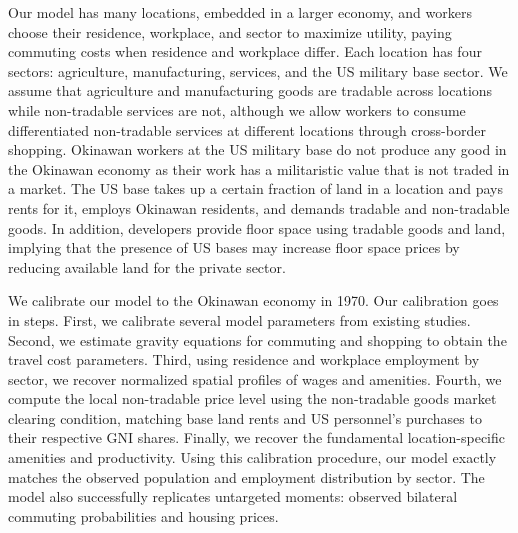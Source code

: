 \documentclass[12pt, unicode, a4paper]{article}
\newcommand{\1}{\mbox{1}\hspace{-0.25em}\mbox{l}} %
\begin{document}
Our model has many locations, embedded in a larger economy, and workers choose their residence, workplace, and sector to maximize utility, paying commuting costs when residence and workplace differ. Each location has four sectors: agriculture, manufacturing, services, and the US military base sector. We assume that agriculture and manufacturing goods are tradable across locations while non-tradable services are not, although we allow workers to consume differentiated non-tradable services at different locations through cross-border shopping. Okinawan workers at the US military base do not produce any good in the Okinawan economy as their work has a militaristic value that is not traded in a market. The US base takes up a certain fraction of land in a location and pays rents for it, employs Okinawan residents, and demands tradable and non-tradable goods. In addition, developers provide floor space using tradable goods and land, implying that the presence of US bases may increase floor space prices by reducing available land for the private sector.

We calibrate our model to the Okinawan economy in 1970. Our calibration goes in steps. First, we calibrate several model parameters from existing studies. Second, we estimate gravity equations for commuting and shopping to obtain the travel cost parameters. Third, using residence and workplace employment by sector, we recover normalized spatial profiles of wages and amenities. Fourth, we compute the local non-tradable price level using the non-tradable goods market clearing condition, matching base land rents and US personnel's purchases to their respective GNI shares. Finally, we recover the fundamental location-specific amenities and productivity. Using this calibration procedure, our model exactly matches the observed population and employment distribution by sector. The model also successfully replicates untargeted moments: observed bilateral commuting probabilities and housing prices. 
\end{document}
